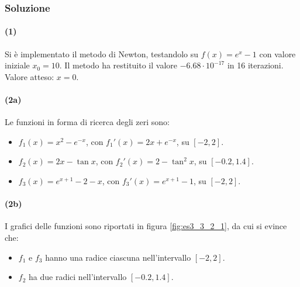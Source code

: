 \documentclass[letterpaper, 12pt]{article}
\numberwithin{equation}{section}    %
\begin{document}
\subsubsection{Soluzione}
\paragraph{(1)}Si è implementato il metodo di Newton, testandolo su $f(x)=e^x - 1$ con valore
iniziale $x_0 = 10$. Il metodo ha restituito il valore $-6.68 \cdot 10^{-17}$ in 16 iterazioni. 
Valore atteso: $x = 0$. 

\paragraph{(2a)}\label{sec:332_2a}Le funzioni in forma di ricerca degli zeri sono:
\begin{itemize}
    \item $f_1(x) = x^2 - e^{-x}$, con $f_1'(x) = 2x + e^{-x}$, su $[-2,2]$.
    \item $f_2(x) = 2x - \tan x$, con $f_2'(x) = 2 - \tan^2 x$, su $[-0.2,1.4]$.
    \item $f_3(x) = e^{x+1} - 2 - x$, con $f_3'(x) = e^{x+1} - 1$, su $[-2,2]$.
\end{itemize}

\paragraph{(2b)}\label{sec:332_2b}I grafici delle funzioni sono riportati in figura \ref{fig:es3_3_2_1}, 
da cui si evince che:
\begin{itemize}
    \item $f_1$ e $f_3$ hanno una radice ciascuna nell'intervallo $[-2,2]$.
    \item $f_2$ ha due radici nell'intervallo $[-0.2,1.4]$.
\end{itemize}
\end{document}
